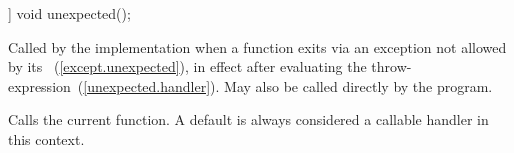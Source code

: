 %
\begin{itemdecl}
[[noreturn]] void unexpected();
\end{itemdecl}

\begin{itemdescr}
\pnum
\remarks
Called by the implementation when a function exits via an exception not allowed by its
~(\ref{except.unexpected}), in
effect after evaluating the throw-expression~(\ref{unexpected.handler}).
May also be called directly by the program.

\pnum
\effects
Calls the current  function.
\enternote A default  is always considered a callable handler in
this context. \exitnote
\end{itemdescr}
